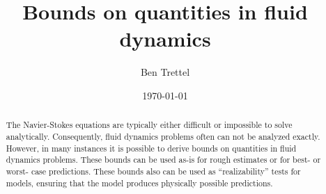 \documentclass[ccbysa,note,git]{bmtreport}
\title{Bounds on quantities in fluid dynamics}
\author{Ben Trettel}
\date{\today}
\begin{document}
\maketitle
\begin{abstract}
The Navier-Stokes equations are typically either difficult or impossible to solve analytically. Consequently, fluid dynamics problems often can not be analyzed exactly. However, in many instances it is possible to derive bounds on quantities in fluid dynamics problems. These bounds can be used as-is for rough estimates or for best- or worst- case predictions. These bounds also can be used as ``realizability'' tests for models, ensuring that the model produces physically possible predictions.
\end{abstract}



        





\end{document}
